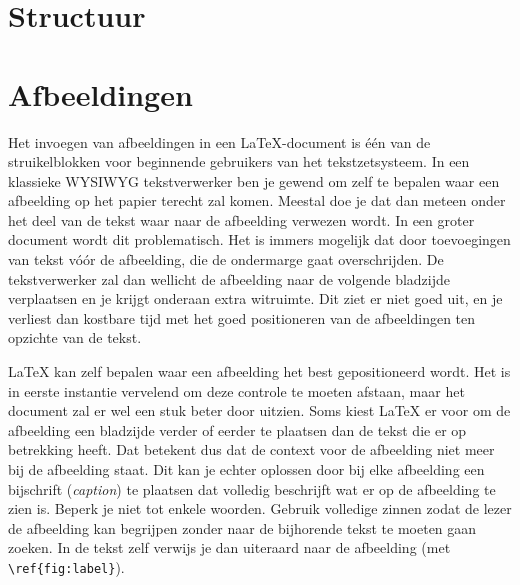 \section{Structuur}
\label{sec:structuur}


%

\section{Afbeeldingen}
\label{sec:afbeeldingen}

Het invoegen van afbeeldingen in een {\LaTeX}-document is \'e\'en van de struikelblokken voor beginnende gebruikers van het tekstzetsysteem. In een klassieke WYSIWYG tekstverwerker ben je gewend om zelf te bepalen waar een afbeelding op het papier terecht zal komen. Meestal doe je dat dan meteen onder het deel van de tekst waar naar de afbeelding verwezen wordt. In een groter document wordt dit problematisch. Het is immers mogelijk dat door toevoegingen van tekst vóór de afbeelding, die de ondermarge gaat overschrijden. De tekstverwerker zal dan wellicht de afbeelding naar de volgende bladzijde verplaatsen en je krijgt onderaan extra witruimte. Dit ziet er niet goed uit, en je verliest dan kostbare tijd met het goed positioneren van de afbeeldingen ten opzichte van de tekst.

{\LaTeX} kan zelf bepalen waar een afbeelding het best gepositioneerd wordt. Het is in eerste instantie vervelend om deze controle te moeten afstaan, maar het document zal er wel een stuk beter door uitzien. Soms kiest {\LaTeX} er voor om de afbeelding een bladzijde verder of eerder te plaatsen dan de tekst die er op betrekking heeft. Dat betekent dus dat de context voor de afbeelding niet meer bij de afbeelding staat. Dit kan je echter oplossen door bij elke afbeelding een bijschrift (\emph{caption}) te plaatsen dat volledig beschrijft wat er op de afbeelding te zien is. Beperk je niet tot enkele woorden. Gebruik volledige zinnen zodat de lezer de afbeelding kan begrijpen zonder naar de bijhorende tekst te moeten gaan zoeken. In de tekst zelf verwijs je dan uiteraard naar de afbeelding (met \verb|\ref{fig:label}|).

